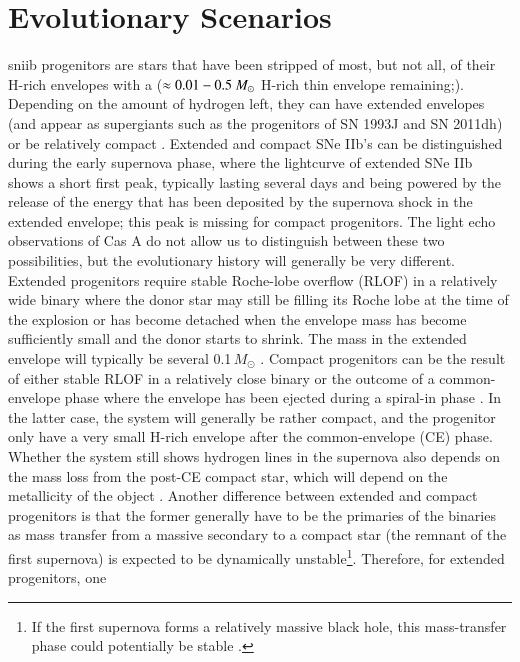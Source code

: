 \documentclass{aa}
\begin{document}
\section{Evolutionary Scenarios}
\label{sec:evol_scenario}

\gls{sniib} progenitors are stars that have been stripped of most, but not
all, of their H-rich envelopes with a ($\approx 0.01 - 0.5~\hbox{$M_{\odot}$}$ H-rich thin envelope remaining;\citealt{1993Natur.364..509P, 2010ApJ...725..940Y, 2011A&A...528A.131C, 2017ApJ...840...10Y}). Depending on the amount of hydrogen
left, they can have extended envelopes (and appear as supergiants such
as the progenitors of SN 1993J and SN 2011dh) or be relatively compact
 \citep[][]{2010ApJ...711L..40C,2017ApJ...840...10Y}. Extended and compact SNe IIb's can be
distinguished during the early supernova phase, where the lightcurve
of extended SNe IIb shows a short first peak, typically lasting
several days and being powered by the release of the energy that has
been deposited by the supernova shock in the extended envelope; this
peak is missing for compact progenitors. The light echo observations
of Cas A do not allow us to distinguish between these two possibilities,
but the evolutionary history will generally be very
different. Extended progenitors require stable Roche-lobe overflow
(RLOF) in a relatively wide binary where the donor star may still be
filling its Roche lobe at the time of the explosion or has become
detached when the envelope mass has become sufficiently small and the
donor starts to shrink. The mass in the extended envelope will
typically be several 0.1\,$M_\odot$ \citep[][]{1993Natur.364..509P}. Compact progenitors can be the result of either stable RLOF in
a relatively close binary \citep[see][]{2017ApJ...840...10Y} or the outcome of a
common-envelope phase where the envelope has been ejected during a
spiral-in phase \citep{1995PhR...256..173N}. In the latter case, the system will generally be
rather compact, and the progenitor only have a very small H-rich
envelope after the common-envelope (CE) phase. Whether the system still shows hydrogen
lines in the supernova also depends on the mass loss from the post-CE
compact star, which will depend on the metallicity of the object \citep[also see][]{2017ApJ...840...10Y}.  Another difference between extended and compact progenitors is that the former generally have to be the
primaries of the binaries as mass transfer from a massive secondary to
a compact star (the remnant of the first supernova) is expected to be
dynamically unstable\footnote{If the first supernova forms a
relatively massive black hole, this mass-transfer phase could
potentially be stable \citep{2017MNRAS.471.4256V}.}.  Therefore, for extended progenitors, one
\end{document}
